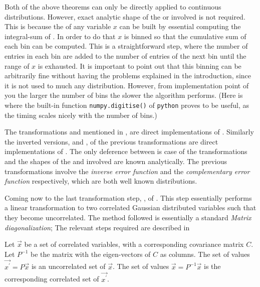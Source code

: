 Both of the above theorems can only be directly applied to continuous distributions.
However, exact analytic shape of the \pdfs or \cdfs involved is not required. This is because the \cdf
of any variable $x$ can be built by essential computing the integral-sum of . In order
to do that $x$ is binned so that the cumulative sum of each bin can be computed. This is a straightforward
step, where the number of entries in each bin are added to the number of entries of the next bin until the
range of $x$ is exhausted. It is important to point out that this binning can be arbitrarily fine without
having the problems explained in the introduction, since it is not used to much any distribution.
However, from implementation point of you the larger the number of bins the slower the algorithm performs.
(Here is where the built-in function {\tt numpy.digitise()} of {\tt python} proves to be useful, as the timing scales
nicely with the number of bins.)

The transformations \gFlat{} and \gGaus{} mentioned in , are direct implementations of
. Similarly the inverted versions, \gFlatInv{} and \gGausInv{},
of the previous transformations are direct implementations of .
The only deference between is case of the transformations \gGaus{} and \gGausInv{} the shapes
of the \pdf and \cdf involved are known analytically. The previous transformations involve the
{\it inverse error function} and the {\it complementary error function} respectively, which
are both well known distributions.

Coming now to the last transformation step, \gGausUn{}, of .
This step essentially performs a linear transformation to two correlated Gaussian distributed
variables such that they become uncorrelated. The method followed is essentially a standard
{\it Matrix diagonalization}; The relevant steps required are described in 

\begin{method}
 Let $\vec{x}$ be a set of correlated variables, with a corresponding covariance matrix $C$.
 Let $P^{-1}$ be the matrix with the eigen-vectors of $C$ as columns.
 The set of values $\vec{x^\prime} = P\vec{x}$ is an uncorrelated set of $\vec{x}$.
 The set of values $\vec{x} = P^{-1}\vec{x}$ is the corresponding correlated set of $\vec{x^{\prime}}$.
 \label{meth_matrix_diag}
\end{method}

